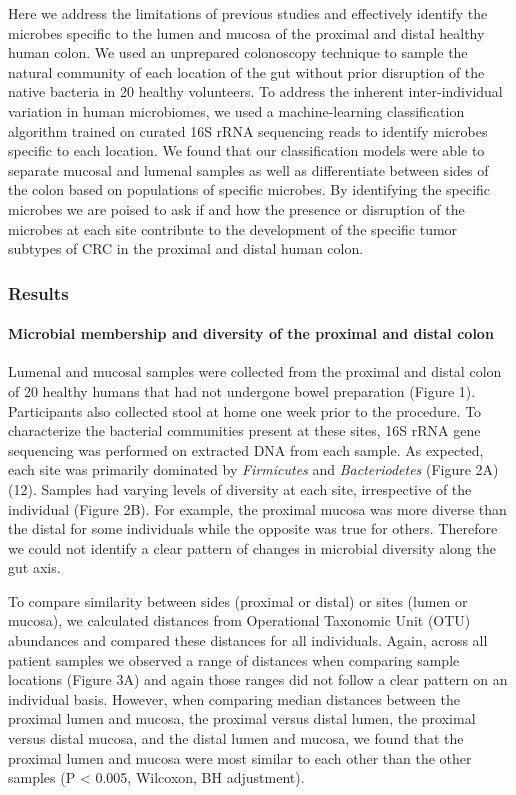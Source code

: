 \documentclass[11pt,]{article}
\let\oldparagraph\paragraph
\renewcommand{\paragraph}[1]{\oldparagraph{#1}\mbox{}}
\begin{document}
Here we address the limitations of previous studies and effectively
identify the microbes specific to the lumen and mucosa of the proximal
and distal healthy human colon. We used an unprepared colonoscopy
technique to sample the natural community of each location of the gut
without prior disruption of the native bacteria in 20 healthy
volunteers. To address the inherent inter-individual variation in human
microbiomes, we used a machine-learning classification algorithm trained
on curated 16S rRNA sequencing reads to identify microbes specific to
each location. We found that our classification models were able to
separate mucosal and lumenal samples as well as differentiate between
sides of the colon based on populations of specific microbes. By
identifying the specific microbes we are poised to ask if and how the
presence or disruption of the microbes at each site contribute to the
development of the specific tumor subtypes of CRC in the proximal and
distal human colon.

\subsubsection{Results}\label{results}

\paragraph{Microbial membership and diversity of the proximal and distal
colon}\label{microbial-membership-and-diversity-of-the-proximal-and-distal-colon}

Lumenal and mucosal samples were collected from the proximal and distal
colon of 20 healthy humans that had not undergone bowel preparation
(Figure 1). Participants also collected stool at home one week prior to
the procedure. To characterize the bacterial communities present at
these sites, 16S rRNA gene sequencing was performed on extracted DNA
from each sample. As expected, each site was primarily dominated by
\emph{Firmicutes} and \emph{Bacteriodetes} (Figure 2A) (12). Samples had
varying levels of diversity at each site, irrespective of the individual
(Figure 2B). For example, the proximal mucosa was more diverse than the
distal for some individuals while the opposite was true for others.
Therefore we could not identify a clear pattern of changes in microbial
diversity along the gut axis.

To compare similarity between sides (proximal or distal) or sites (lumen
or mucosa), we calculated distances from Operational Taxonomic Unit
(OTU) abundances and compared these distances for all individuals.
Again, across all patient samples we observed a range of distances when
comparing sample locations (Figure 3A) and again those ranges did not
follow a clear pattern on an individual basis. However, when comparing
median distances between the proximal lumen and mucosa, the proximal
versus distal lumen, the proximal versus distal mucosa, and the distal
lumen and mucosa, we found that the proximal lumen and mucosa were most
similar to each other than the other samples (P \textless{} 0.005,
Wilcoxon, BH adjustment).
\end{document}
